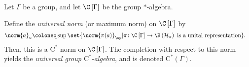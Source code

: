 \begin{proposition}\label{prop:universal_group_cstar_algebra}
  Let $\Gamma$ be a group, and let $\C\left[ \Gamma \right]$ be the group $\ast$-algebra.\newline

  Define the \textit{universal norm} (or maximum norm) on $\C\left[ \Gamma \right]$ by
  \begin{align*}
    \norm{a}_{u} &\coloneq \sup\set{\norm{\pi(a)}_{\op} | \pi\colon \C\left[ \Gamma \right]\rightarrow \B\left( \mathcal{H}_{\pi} \right)\text{ is a unital representation}}.
  \end{align*}
  Then, this is a $\mathrm{C}^{\ast}$-norm on $\C\left[ \Gamma \right]$. The completion with respect to this norm yields the \textit{universal group $\mathrm{C}^{\ast}$-algebra}, and is denoted $\mathrm{C}^{\ast}\left( \Gamma \right)$.
\end{proposition}
